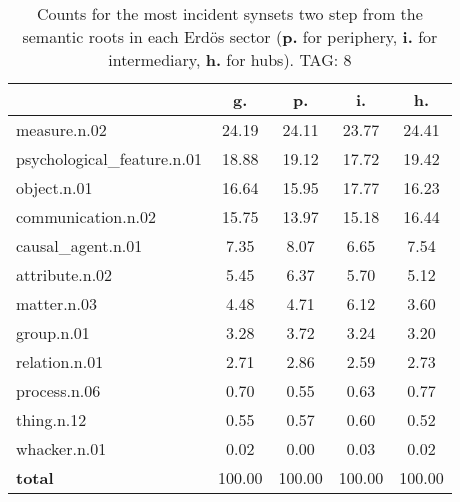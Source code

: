 \begin{table}[h!]
\begin{center}
\begin{tabular}{| l | c | c | c | c |}\hline
 & g. & p. & i. & h. \\\hline
measure.n.02 & 24.19  & 24.11  & 23.77  & 24.41 \\\hline
psychological\_feature.n.01 & 18.88  & 19.12  & 17.72  & 19.42 \\\hline
object.n.01 & 16.64  & 15.95  & 17.77  & 16.23 \\\hline
communication.n.02 & 15.75  & 13.97  & 15.18  & 16.44 \\\hline
causal\_agent.n.01 & 7.35  & 8.07  & 6.65  & 7.54 \\\hline
attribute.n.02 & 5.45  & 6.37  & 5.70  & 5.12 \\\hline
matter.n.03 & 4.48  & 4.71  & 6.12  & 3.60 \\\hline
group.n.01 & 3.28  & 3.72  & 3.24  & 3.20 \\\hline
relation.n.01 & 2.71  & 2.86  & 2.59  & 2.73 \\\hline
process.n.06 & 0.70  & 0.55  & 0.63  & 0.77 \\\hline
thing.n.12 & 0.55  & 0.57  & 0.60  & 0.52 \\\hline
whacker.n.01 & 0.02  & 0.00  & 0.03  & 0.02 \\\hline
{{\bf total}} & 100.00  & 100.00  & 100.00  & 100.00 \\\hline
\end{tabular}
\caption{Counts for the most incident synsets two step from the semantic roots in each Erd\"os sector ({\bf p.} for periphery, {\bf i.} for intermediary, {\bf h.} for hubs). TAG: 8}
\end{center}
\end{table}